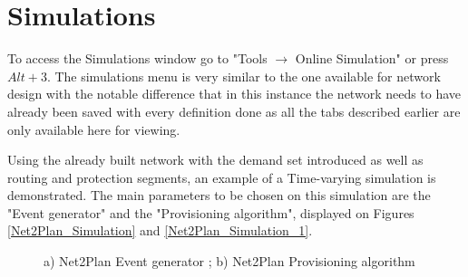 	
	\newpage
	
	
	\section*{Simulations}
	To access the Simulations window go to  "Tools $\rightarrow$ Online Simulation" or press $Alt + 3$. The simulations menu is very similar to the one available for network design with the notable difference that in this instance the network needs to have already been saved with every definition done as all the tabs described earlier are only available here for viewing.
	
	Using the already built network with the demand set introduced as well as routing and protection segments, an example of a Time-varying simulation is demonstrated. The main parameters to be chosen on this simulation are the "Event generator" and the "Provisioning algorithm", displayed on Figures \ref{Net2Plan_Simulation} and \ref{Net2Plan_Simulation_1}.
	
	\vspace{-0.3cm}
	
	\begin{figure}[!h]
		\centering
		\caption{a) Net2Plan Event generator ; b) Net2Plan Provisioning algorithm}
	\end{figure}	

